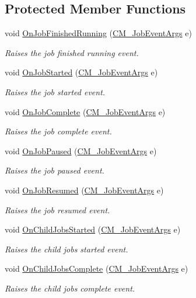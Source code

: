 \subsection*{Protected Member Functions}
\begin{DoxyCompactItemize}
\item 
void \hyperlink{class_c_m___job_af33a79ea5b8e707fb79e594e580d4e17}{On\+Job\+Finished\+Running} (\hyperlink{class_c_m___job_event_args}{C\+M\+\_\+\+Job\+Event\+Args} e)
\begin{DoxyCompactList}\small\item\em Raises the job finished running event. \end{DoxyCompactList}\item 
void \hyperlink{class_c_m___job_a5b3aa9f1598fcf753be6fffad0f9a69a}{On\+Job\+Started} (\hyperlink{class_c_m___job_event_args}{C\+M\+\_\+\+Job\+Event\+Args} e)
\begin{DoxyCompactList}\small\item\em Raises the job started event. \end{DoxyCompactList}\item 
void \hyperlink{class_c_m___job_a6386d33b5ef65196a144598cb34fc12f}{On\+Job\+Complete} (\hyperlink{class_c_m___job_event_args}{C\+M\+\_\+\+Job\+Event\+Args} e)
\begin{DoxyCompactList}\small\item\em Raises the job complete event. \end{DoxyCompactList}\item 
void \hyperlink{class_c_m___job_a61f918b9776bf4437f3a0efa9cde64a2}{On\+Job\+Paused} (\hyperlink{class_c_m___job_event_args}{C\+M\+\_\+\+Job\+Event\+Args} e)
\begin{DoxyCompactList}\small\item\em Raises the job paused event. \end{DoxyCompactList}\item 
void \hyperlink{class_c_m___job_a6b6887d0dd433362ea571cdc4a419be1}{On\+Job\+Resumed} (\hyperlink{class_c_m___job_event_args}{C\+M\+\_\+\+Job\+Event\+Args} e)
\begin{DoxyCompactList}\small\item\em Raises the job resumed event. \end{DoxyCompactList}\item 
void \hyperlink{class_c_m___job_a39e81165ee12eb69e01e2052dd4add3e}{On\+Child\+Jobs\+Started} (\hyperlink{class_c_m___job_event_args}{C\+M\+\_\+\+Job\+Event\+Args} e)
\begin{DoxyCompactList}\small\item\em Raises the child jobs started event. \end{DoxyCompactList}\item 
void \hyperlink{class_c_m___job_a64f5a20ea7643b75584a1b63b8098011}{On\+Child\+Jobs\+Complete} (\hyperlink{class_c_m___job_event_args}{C\+M\+\_\+\+Job\+Event\+Args} e)
\begin{DoxyCompactList}\small\item\em Raises the child jobs complete event. \end{DoxyCompactList}\end{DoxyCompactItemize}
